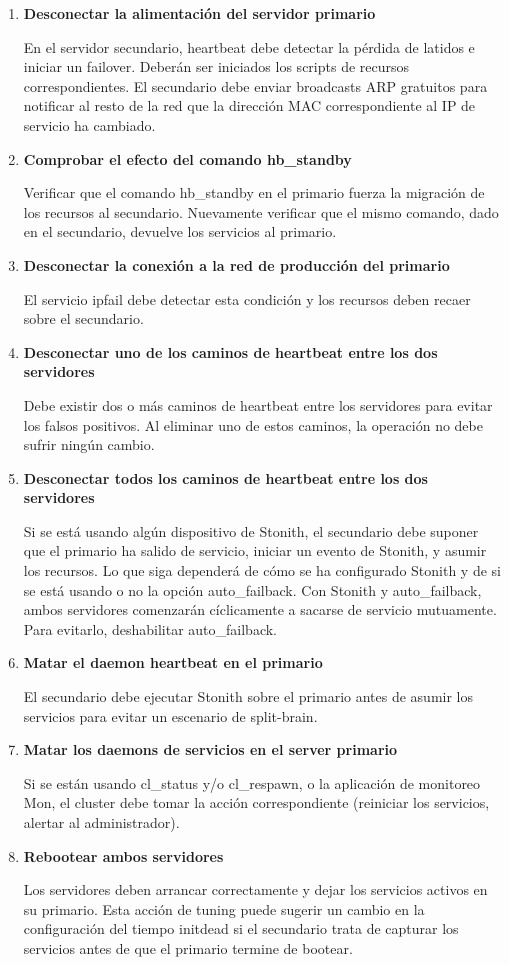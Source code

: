 \begin{enumerate}
	\item \textbf{Desconectar la alimentación del servidor primario}

En el servidor secundario, heartbeat debe detectar la pérdida de latidos e iniciar un failover. Deberán ser iniciados los scripts de recursos correspondientes. El secundario debe enviar broadcasts ARP gratuitos para notificar al resto de la red que la dirección MAC correspondiente al IP de servicio ha cambiado.
	\item \textbf{Comprobar el efecto del comando hb\_standby}

Verificar que el comando hb\_standby en el primario fuerza la migración de los recursos al secundario. Nuevamente verificar que el mismo comando, dado en el secundario, devuelve los servicios al primario.
	\item \textbf{Desconectar la conexión a la red de producción del primario}

El servicio ipfail debe detectar esta condición y los recursos deben recaer sobre el secundario.

	\item \textbf{Desconectar uno de los caminos de heartbeat entre los dos servidores}

Debe existir dos o más caminos de heartbeat entre los servidores para evitar los falsos positivos. Al eliminar uno de estos caminos, la operación no debe sufrir ningún cambio.
	\item \textbf{Desconectar todos los caminos de heartbeat entre los dos servidores}

Si se está usando algún dispositivo de Stonith, el secundario debe suponer que el primario ha salido de servicio, iniciar un evento de Stonith, y asumir los recursos. Lo que siga dependerá de cómo se ha configurado Stonith y de si se está usando o no la opción auto\_failback. Con Stonith y auto\_failback, ambos servidores comenzarán cíclicamente a sacarse de servicio mutuamente. Para evitarlo, deshabilitar auto\_failback.
	\item \textbf{Matar el daemon heartbeat en el primario}

El secundario debe ejecutar Stonith sobre el primario antes de asumir los servicios para evitar un escenario de split-brain.
	\item \textbf{Matar los daemons de servicios en el server primario}

Si se están usando cl\_status y/o cl\_respawn, o la aplicación de monitoreo Mon, el cluster debe tomar la acción correspondiente (reiniciar los servicios, alertar al administrador).
	\item \textbf{Rebootear ambos servidores}
	
Los servidores deben arrancar correctamente y dejar los servicios activos en su primario. Esta acción de tuning puede sugerir un cambio en la configuración del tiempo initdead si el secundario trata de capturar los servicios antes de que el primario termine de bootear. 
\end{enumerate}



